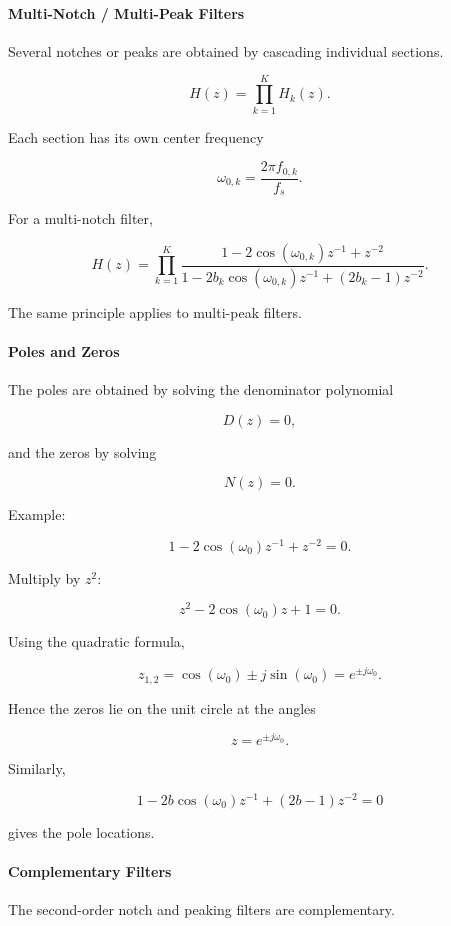 \paragraph{Multi-Notch / Multi-Peak Filters}

Several notches or peaks are obtained by cascading individual sections.

\[
H(z)
=
\prod_{k=1}^{K}
H_k(z).
\]

Each section has its own center frequency

\[
\omega_{0,k}
=
\frac{2\pi f_{0,k}}{f_s}.
\]

For a multi-notch filter,

\[
H(z)
=
\prod_{k=1}^{K}
\frac
{1-2\cos(\omega_{0,k})z^{-1}+z^{-2}}
{1-2b_k\cos(\omega_{0,k})z^{-1}
+(2b_k-1)z^{-2}}.
\]

The same principle applies to multi-peak filters.

\paragraph{Poles and Zeros}

The poles are obtained by solving the denominator polynomial

\[
D(z)=0,
\]

and the zeros by solving

\[
N(z)=0.
\]

Example:

\[
1-2\cos(\omega_0)z^{-1}+z^{-2}=0.
\]

Multiply by $z^2$:

\[
z^2-2\cos(\omega_0)z+1=0.
\]

Using the quadratic formula,

\[
z_{1,2}
=
\cos(\omega_0)
\pm
j\sin(\omega_0)
=
e^{\pm j\omega_0}.
\]

Hence the zeros lie on the unit circle at the angles

\[
\boxed{
z=e^{\pm j\omega_0}.
}
\]

Similarly,

\[
1-2b\cos(\omega_0)z^{-1}
+(2b-1)z^{-2}=0
\]

gives the pole locations.

\paragraph{Complementary Filters}

The second-order notch and peaking filters are complementary.

